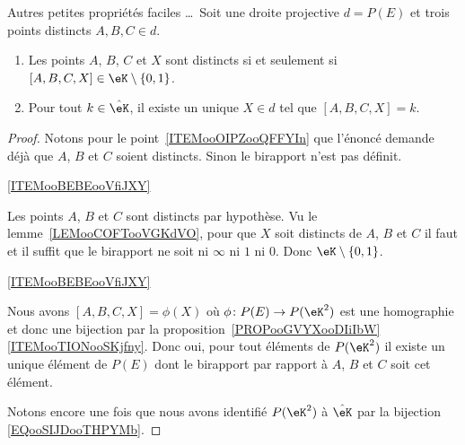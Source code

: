 \begin{proposition}     \label{PROPooKQZRooVCXPLW}
    Autres petites propriétés faciles \ldots\ Soit une droite projective \( d=P(E)\) et trois points distincts \( A,B,C\in d\).
    \begin{enumerate}
        \item       \label{ITEMooOIPZooQFFYIn}
            Les points \( A\), \( B\), \( C\) et \( X\) sont distincts si et seulement si \( [A,B,C,X]\in \eK\setminus\{ 0,1 \}\).
        \item       \label{ITEMooBEBEooVfiJXY}
            Pour tout \( k\in \hat\eK\), il existe un unique \( X\in d\) tel que \( [A,B,C,X]=k\).
    \end{enumerate}
\end{proposition}

\begin{proof}
    Notons pour le point~\ref{ITEMooOIPZooQFFYIn} que l'énoncé demande déjà que \( A\), \( B\) et \( C\) soient distincts. Sinon le birapport n'est pas définit.
    \begin{subproof}
        \item[\ref{ITEMooBEBEooVfiJXY}]

            Les points \( A\), \( B\) et \( C\) sont distincts par hypothèse. Vu le lemme~\ref{LEMooCOFTooVGKdVO}, pour que \( X\) soit distincts de \( A\), \( B\) et \( C\) il faut et il suffit que le birapport ne soit ni \( \infty\) ni \( 1\) ni \( 0\). Donc \( \eK\setminus\{ 0,1 \}\).

        \item[\ref{ITEMooBEBEooVfiJXY}]

            Nous avons \( [A,B,C,X]=\phi(X)\) où \( \phi\colon P(E)\to P(\eK^2)\) est une homographie et donc une bijection par la proposition~\ref{PROPooGVYXooDIiIbW}\ref{ITEMooTIONooSKjfny}. Donc oui, pour tout éléments de \( P(\eK^2)\) il existe un unique élément de \( P(E)\) dont le birapport par rapport à \( A\), \( B\) et \( C\) soit cet élément.

    \end{subproof}
    Notons encore une fois que nous avons identifié \( P(\eK^2)\) à \( \hat\eK\) par la bijection \eqref{EQooSIJDooTHPYMb}.
\end{proof}

